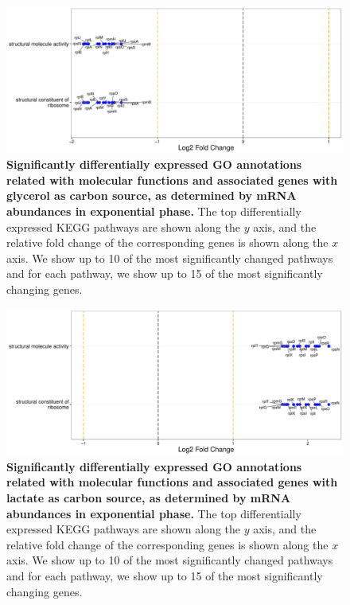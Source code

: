 \documentclass[a4paper]{article}
\begin{document}
\begin{figure}[!htb]
	\includegraphics[width=1.0\textwidth]{../../d_figures/mf_n_01.pdf}
	\caption[Significantly differentially expressed GO annotations associated with molecular functions for mRNA samples in exponential phase tested for glycerol against glucose]
	{\textbf{Significantly differentially expressed GO annotations related with molecular functions and associated genes with glycerol as carbon source, as determined by mRNA abundances in exponential phase.} The top differentially expressed KEGG pathways are shown along the $y$ axis, and the relative fold change of the corresponding genes is shown along the $x$ axis. We show up to 10 of the most significantly changed pathways and for each pathway, we show up to 15 of the most significantly changing genes.}
\end{figure}

\clearpage
\begin{figure}
	\includegraphics[width=1.0\textwidth]{../../d_figures/mf_n_02.pdf}
	\caption[Significantly differentially expressed GO annotations associated with molecular functions for mRNA samples in exponential phase tested for lactate against glucose]
	{\textbf{Significantly differentially expressed GO annotations related with molecular functions and associated genes with lactate as carbon source, as determined by mRNA abundances in exponential phase.} The top differentially expressed KEGG pathways are shown along the $y$ axis, and the relative fold change of the corresponding genes is shown along the $x$ axis. We show up to 10 of the most significantly changed pathways and for each pathway, we show up to 15 of the most significantly changing genes.}
\end{figure}
\end{document}
